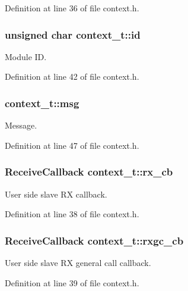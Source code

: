 Definition at line 36 of file context.\-h.

\hypertarget{structcontext__t_afcfccef1ae4111aee136acf0d92b4379}{
\subsubsection[{id}]{\setlength{\rightskip}{0pt plus 5cm}unsigned char context\-\_\-t\-::id}}\label{structcontext__t_afcfccef1ae4111aee136acf0d92b4379}
Module I\-D. 

Definition at line 42 of file context.\-h.

\hypertarget{structcontext__t_ae806cd53ff68971d122ab6f854d22b8d}{
\subsubsection[{msg}]{ context\-\_\-t\-::msg}}\label{structcontext__t_ae806cd53ff68971d122ab6f854d22b8d}
Message. 

Definition at line 47 of file context.\-h.

\hypertarget{structcontext__t_a73e2dad8cc38ed72d324ab0ae11f0f52}{
\subsubsection[{rx\-\_\-cb}]{\setlength{\rightskip}{0pt plus 5cm}Receive\-Callback context\-\_\-t\-::rx\-\_\-cb}}\label{structcontext__t_a73e2dad8cc38ed72d324ab0ae11f0f52}
User side slave R\-X callback. 

Definition at line 38 of file context.\-h.

\hypertarget{structcontext__t_ae8acba22504829448da7fa1cf793c7a3}{
\subsubsection[{rxgc\-\_\-cb}]{\setlength{\rightskip}{0pt plus 5cm}Receive\-Callback context\-\_\-t\-::rxgc\-\_\-cb}}\label{structcontext__t_ae8acba22504829448da7fa1cf793c7a3}
User side slave R\-X general call callback. 

Definition at line 39 of file context.\-h.


